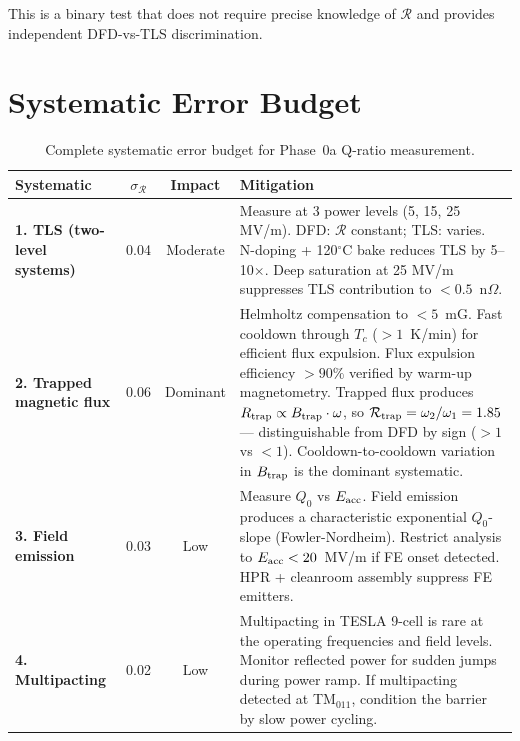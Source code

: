 \documentclass[11pt]{article}
\theoremstyle{definition}
\theoremstyle{remark}
\begin{document}
This is a binary test that does not require precise knowledge
of $\mathcal{R}$ and provides independent DFD-vs-TLS discrimination.


\part{Systematic Error Budget}
\label{sec:systematics}


\begin{table}[H]
\centering
\caption{Complete systematic error budget for Phase~0a Q-ratio
measurement.}
\label{tab:systematics}
\renewcommand{\arraystretch}{1.3}
\begin{tabular}{@{}p{3.5cm}ccp{5cm}@{}}
\toprule
\textbf{Systematic} & \textbf{$\sigma_{\mathcal{R}}$}
& \textbf{Impact} & \textbf{Mitigation} \\
\midrule

\textbf{1. TLS (two-level systems)}
& 0.04 & Moderate
& Measure at 3 power levels (5, 15, 25 MV/m). DFD:
$\mathcal{R}$ constant; TLS: varies. N-doping + 120$^\circ$C bake
reduces TLS by 5--10$\times$. Deep saturation at 25 MV/m suppresses
TLS contribution to $< 0.5$~n$\Omega$. \\

\textbf{2. Trapped magnetic flux}
& 0.06 & Dominant
& Helmholtz compensation to $< 5$~mG. Fast cooldown through $T_c$
($> 1$~K/min) for efficient flux expulsion. Flux expulsion efficiency
$> 90\%$ verified by warm-up magnetometry. Trapped flux produces
$R_{\rm trap} \propto B_{\rm trap} \cdot \omega$, so
$\mathcal{R}_{\rm trap} = \omega_2/\omega_1 = 1.85$ ---
distinguishable from DFD by sign ($> 1$ vs $< 1$). Cooldown-to-cooldown
variation in $B_{\rm trap}$ is the dominant systematic. \\

\textbf{3. Field emission}
& 0.03 & Low
& Measure $Q_0$ vs $E_{\rm acc}$. Field emission produces a
characteristic exponential $Q_0$-slope (Fowler-Nordheim).
Restrict analysis to $E_{\rm acc} < 20$~MV/m if FE onset
detected. HPR + cleanroom assembly suppress FE emitters. \\

\textbf{4. Multipacting}
& 0.02 & Low
& Multipacting in TESLA 9-cell is rare at the operating frequencies
and field levels. Monitor reflected power for sudden jumps during
power ramp. If multipacting detected at TM$_{011}$, condition the
barrier by slow power cycling. \\


\end{tabular}
\end{table}
\end{document}
